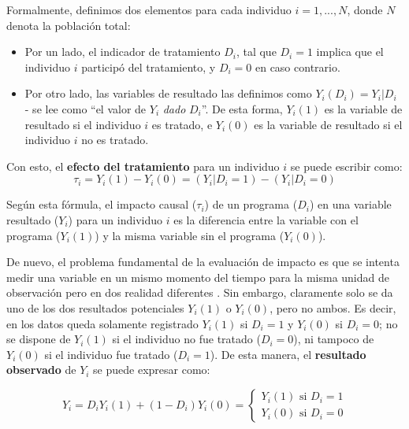 \documentclass[../../main.tex]{subfiles}
\begin{document}
Formalmente, definimos dos elementos para cada individuo \(i = 1,...,N\), donde \(N\) denota la población total:
\begin{itemize}
    \item Por un lado, el indicador de tratamiento \(D_i\), tal que \(D_i = 1\) implica que el individuo \(i\) participó del tratamiento, y \(D_i = 0\) en caso contrario.
    \item Por otro lado, las variables de resultado las definimos como \(Y_i(D_i) = Y_i|D_i\) - se lee como ``el valor de \(Y_i\) \textit{dado} \(D_i\)''. De esta forma, \(Y_i(1)\) es la variable de resultado si el individuo \(i\) es tratado, e \(Y_i(0)\) es la variable de resultado si el individuo \(i\) no es tratado.
\end{itemize}

Con esto, el \textbf{efecto del tratamiento} para un individuo \(i\) se puede escribir como:
\begin{equation}
    \tau_i = Y_i(1) - Y_i(0) = (Y_i|D_i=1) - (Y_i|D_i=0)
    \label{eq:ite} %
\end{equation}

Según esta fórmula, el impacto causal (\(\tau_i\)) de un programa (\(D_i\)) en una variable resultado (\(Y_i\)) para un individuo \(i\) es la diferencia entre la variable con el programa (\(Y_i(1)\)) y la misma variable sin el programa (\(Y_i(0)\)). 

De nuevo, el problema fundamental de la evaluación de impacto es que se intenta medir una variable en un mismo momento del tiempo para la misma unidad de observación pero en dos realidad diferentes \cite{gertler-2016}. Sin embargo, claramente solo se da uno de los dos resultados potenciales \(Y_i(1)\) o \(Y_i(0)\), pero no ambos. Es decir, en los datos queda solamente registrado \(Y_i(1)\) si \(D_i=1\) y \(Y_i(0)\) si \(D_i=0\); no se dispone de \(Y_i(1)\) si el individuo no fue tratado (\(D_i=0\)), ni tampoco de \(Y_i(0)\) si el individuo fue tratado (\(D_i=1\)). De esta manera, el \textbf{resultado observado} de \(Y_i\) se puede expresar como:

\begin{equation}
    Y_i = D_i Y_i(1) + (1-D_i)Y_i(0) =
    \begin{cases}
        Y_i(1) \text{ si } D_i=1 \\
        Y_i(0) \text{ si } D_i=0
    \end{cases}
    \label{eq:observed-result}
\end{equation}
\end{document}
